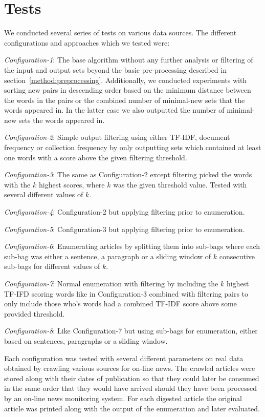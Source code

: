\section{Tests}
We conducted several series of tests on various data sources. The different configurations and approaches which we tested were:

\emph{Configuration-1}: The base algorithm without any further analysis or filtering of the input and output sets beyond the basic pre-processing described in section~\ref{method:preprocessing}. Additionally, we conducted experiments with sorting new pairs in descending order based on the minimum distance between the words in the pairs or the combined number of minimal-new sets that the words appeared in. In the latter case we also outputted the number of minimal-new sets the words appeared in.

\emph{Configuration-2}: Simple output filtering using either TF-IDF, document frequency or collection frequency by only outputting sets which contained at least one words with a score above the given filtering threshold. 

\emph{Configuration-3}: The same as Configuration-2 except filtering picked the words with the $k$ highest scores, where $k$ was the given threshold value. Tested with several different values of $k$.

\emph{Configuration-4}: Configuration-2 but applying filtering prior to enumeration.

\emph{Configuration-5}: Configuration-3 but applying filtering prior to enumeration.

\emph{Configuration-6}: Enumerating articles by splitting them into sub-bags where each sub-bag was either a sentence, a paragraph or a sliding window of $k$ consecutive sub-bags for different values of $k$.

\emph{Configuration-7}: Normal enumeration with filtering by including the $k$ highest TF-IFD scoring words like in Configuration-3 combined with filtering pairs to only include those who's words had a combined TF-IDF score above some provided threshold.

\emph{Configuration-8}: Like Configuration-7 but using sub-bags for enumeration, either based on sentences, paragraphs or a sliding window.

Each configuration was tested with several different parameters on real data obtained by crawling various sources for on-line news. The crawled articles were stored along with their dates of publication so that they could later be consumed in the same order that they would have arrived should they have been processed by an on-line news monitoring system. For each digested article the original article was printed along with the output of the enumeration and later evaluated. 

